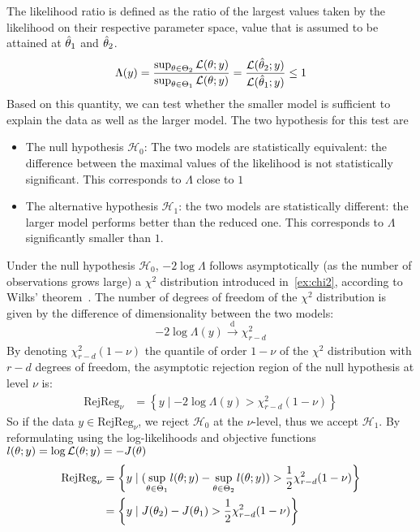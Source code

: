 \documentclass[../../Main_ManuscritThese.tex]{subfiles}
\begin{document}
The likelihood ratio is defined as the ratio of the largest values
taken by the likelihood on their respective parameter space, value
that is assumed to be attained at $\hat{\theta}_1$ and $\hat{\theta}_2$.
\begin{equation}
  \label{eq:def_lik_ratio}
  \Lambda(y) = \frac{\sup_{\theta \in \Theta_2} \mathcal{L}(\theta ; y)}{\sup_{\theta \in \Theta_1} \mathcal{L}(\theta ; y)} = \frac{\mathcal{L}(\hat{\theta}_2 ; y)}{\mathcal{L}(\hat{\theta}_1 ; y)} \leq 1
\end{equation}
Based on this quantity, we can test whether the smaller model is
sufficient to explain the data as well as the larger model. The two
hypothesis for this test are
\begin{itemize}
\item The null hypothesis $\mathcal{H}_0$: The two models are
  statistically equivalent: the difference between the maximal values
  of the likelihood is not statistically significant. This corresponds
  to $\Lambda$ close to $1$
\item The alternative hypothesis $\mathcal{H}_1$: the two models are
  statistically different: the larger model performs better than the
  reduced one. This corresponds to $\Lambda$ significantly smaller
  than $1$.
\end{itemize}
Under the null hypothesis $\mathcal{H}_0$, $-2 \log \Lambda$ follows
asymptotically (as the number of observations grows large) a $\chi^2$
distribution introduced in~\cref{ex:chi2}, according to Wilks'
theorem~\citep{wilks_large-sample_1938}. The number of degrees of
freedom of the $\chi^2$ distribution is given by the difference of
dimensionality between the two models:
\begin{equation}
  \label{eq:deviance_asymptotics}
  - 2 \log \Lambda(y) \xrightarrow[]{\mathrm{d}} \chi^2_{r-d}
\end{equation}
By denoting $\chi^2_{r-d}(1-\nu)$ the quantile of order $1-\nu$ of the $\chi^2$ distribution with $r-d$ degrees of freedom, the asymptotic rejection region of the null hypothesis at level $\nu$ is:
\begin{align}
  \mathrm{RejReg}_{\nu} &= \left\{y \mid -2 \log \Lambda(y) > \chi^2_{r-d}(1-\nu) \right\} \label{eq:LRT_rej_reg}
\end{align}
So if the data $y \in \mathrm{RejReg}_{\nu}$, we reject $\mathcal{H}_0$ at the $\nu$-level, thus we accept $\mathcal{H}_1$.
By reformulating using the log-likelihoods and objective functions $l(\theta;y) = \log \mathcal{L}(\theta;y) = - J(\theta)$
\begin{align}
  \mathrm{RejReg}_{\nu} &= \left\{ y \mid (\sup_{\theta\in\Theta_1} l(\theta;y) - \sup_{\theta\in\Theta_2} l(\theta;y)) > \frac12 \chi^2_{r-d}(1-\nu) \right\} \\
                             &= \left\{ y \mid J(\theta_2) - J(\theta_1) >  \frac12 \chi^2_{r-d}(1-\nu) \right\} \label{eq:rejreg_chi2}
\end{align}
\end{document}
